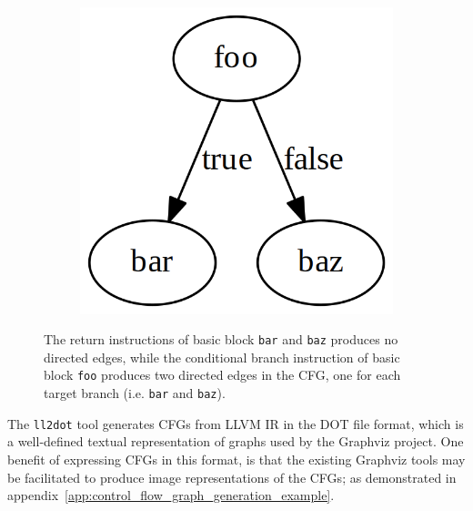 \begin{figure}[htbp]
	\centering
	\begin{subfigure}[ht]{0.54\textwidth}
		
	\end{subfigure}
	\enskip
	\begin{subfigure}[ht]{0.22\textwidth}
		\includegraphics[width=\textwidth]{inc/8_ver/directed_edges.png}
	\end{subfigure}
	\caption{The return instructions of basic block \texttt{bar} and \texttt{baz} produces no directed edges, while the conditional branch instruction of basic block \texttt{foo} produces two directed edges in the CFG, one for each target branch (i.e. \texttt{bar} and \texttt{baz}).}
	\label{fig:directed_edges}
\end{figure}

The \texttt{ll2dot} tool generates CFGs from LLVM IR in the DOT file format, which is a well-defined textual representation of graphs used by the Graphviz project. One benefit of expressing CFGs in this format, is that the existing Graphviz tools may be facilitated to produce image representations of the CFGs; as demonstrated in appendix~\ref{app:control_flow_graph_generation_example}.

